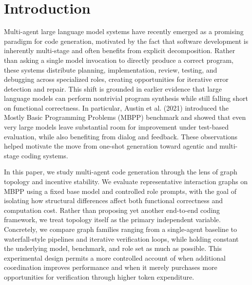 \documentclass[manuscript,screen,review]{acmart}
\begin{document}

\maketitle

\section{Introduction}

Multi-agent large language model systems have recently emerged as a promising paradigm for code generation, motivated by the fact that software development is inherently multi-stage and often benefits from explicit decomposition. Rather than asking a single model invocation to directly produce a correct program, these systems distribute planning, implementation, review, testing, and debugging across specialized roles, creating opportunities for iterative error detection and repair. This shift is grounded in earlier evidence that large language models can perform nontrivial program synthesis while still falling short on functional correctness. In particular, Austin et al. (2021) introduced the Mostly Basic Programming Problems (MBPP) benchmark and showed that even very large models leave substantial room for improvement under test-based evaluation, while also benefiting from dialog and feedback. These observations helped motivate the move from one-shot generation toward agentic and multi-stage coding systems.

In this paper, we study multi-agent code generation through the lens of graph topology and incentive stability. We evaluate representative interaction graphs on MBPP using a fixed base model and controlled role prompts, with the goal of isolating how structural differences affect both functional correctness and computation cost. Rather than proposing yet another end-to-end coding framework, we treat topology itself as the primary independent variable. Concretely, we compare graph families ranging from a single-agent baseline to waterfall-style pipelines and iterative verification loops, while holding constant the underlying model, benchmark, and role set as much as possible. This experimental design permits a more controlled account of when additional coordination improves performance and when it merely purchases more opportunities for verification through higher token expenditure.
\end{document}

